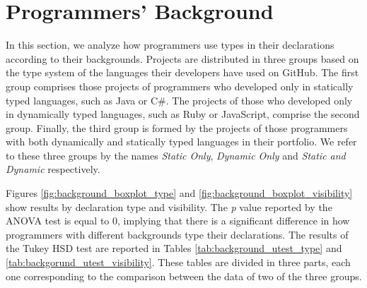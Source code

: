 \documentclass[msc]{ppgccufmg}
\begin{document}
\section{Programmers' Background\label{sec:results-background}}
In this section, we analyze how programmers use types in their declarations according to their backgrounds.
Projects are distributed in three groups based on the type system of the languages their developers have used on GitHub.
The first group comprises those projects of programmers who developed only in statically typed languages, such as Java or C\#.
The projects of those who developed only in dynamically typed languages, such as Ruby or JavaScript, comprise the second group.
Finally, the third group is formed by the projects of those programmers with both dynamically and statically typed languages in their portfolio.
We refer to these three groups by the names \emph{Static Only}, \emph{Dynamic Only} and \emph{Static and Dynamic} respectively.

Figures \ref{fig:background_boxplot_type} and \ref{fig:background_boxplot_visibility}  show results by declaration type and visibility.
The \emph{p} value reported by the ANOVA test is equal to 0, implying that there is a significant difference in how programmers with different backgrounds type their declarations.
The results of the Tukey HSD test are reported in Tables \ref{tab:background_utest_type} and \ref{tab:backgorund_utest_visibility}.
These tables are divided in three parts, each one corresponding to the comparison between the data of two of the three groups.
\end{document}
